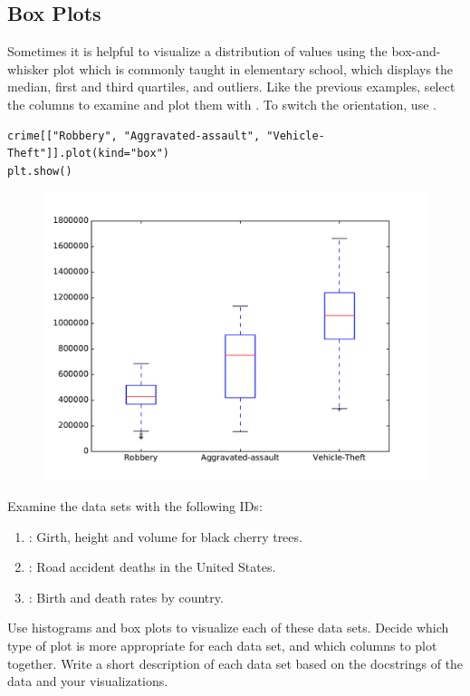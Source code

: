\subsection*{Box Plots}

Sometimes it is helpful to visualize a distribution of values using the box-and-whisker plot which is commonly taught in elementary school, which
displays the median, first and third quartiles, and outliers.
Like the previous examples, select the columns to examine and plot them with .
To switch the orientation, use .

\begin{lstlisting}
crime[["Robbery", "Aggravated-assault", "Vehicle-Theft"]].plot(kind="box")
plt.show()
\end{lstlisting}

\begin{figure}[H] %
    \centering
    \includegraphics[width=.75\textwidth]{box1.pdf}
    \label{fig:box}
\end{figure}

\begin{problem}
Examine the data sets with the following  IDs:
\begin{enumerate}
\item {}: Girth, height and volume for black cherry trees.
\item {}: Road accident deaths in the United States.
\item {}: Birth and death rates by country.
\end{enumerate}
Use histograms and box plots to visualize each of these data sets.
Decide which type of plot is more appropriate for each data set, and which columns to plot together.
Write a short description of each data set based on the docstrings of the data and your visualizations.
\end{problem}

